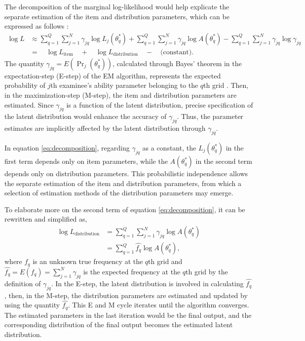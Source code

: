 The decomposition of the marginal log-likelihood would help explicate the
separate estimation of the item and distribution parameters, which can
be expressed as follows \citep{Li:2021}:
\begin{equation}
\begin{split}
\log L &\approx \sum_{q = 1}^{Q}{ \sum_{j = 1}^{N}
{ \gamma_{jq} \log{L_j{\left( \theta^{*}_{q} \right)}} } } +
\sum_{q = 1}^{Q}{ \sum_{j = 1}^{N}
{ \gamma_{jq} \log{A{\left( \theta^{*}_{q} \right)}} } } -
\sum_{q = 1}^{Q}{ \sum_{j = 1}^{N}{ \gamma_{jq} \log{\gamma_{jq}} } } \\
&= \quad \log{L_{\text{item}}} \quad
+ \quad \log{L_{\text{distribution}}} \quad - \quad \text{(constant)} .
\end{split}
\label{eq:decomposition}
\end{equation}
The quantity
\(\gamma_{jq} = E{\left(\Pr_{j}{\left( \theta_{q}^{*} \right)}\right)}\),
calculated through Bayes' theorem in the expectation-step (E-step) of
the EM algorithm, represents the expected probability of \(j\)th
examinee's ability parameter belonging to the \(q\)th grid \citep[see][]{Baker+Kim:2004}. Then, in the maximization-step (M-step), the item and
distribution parameters are estimated. Since \(\gamma_{jq}\) is a function
of the latent distribution, precise specification of the latent
distribution would enhance the accuracy of \(\gamma_{jq}\). Thus, the
parameter estimates are implicitly affected by the latent distribution
through \(\gamma_{jq}\).

In equation \eqref{eq:decomposition}, regarding \(\gamma_{jq}\) as a
constant, the \(L_j{\left( \theta^{*}_{q} \right)}\) in the first
term depends only on item parameters, while the
\(A{\left( \theta^{*}_{q} \right)}\) in the second term depends only on
distribution parameters. This probabilistic independence allows the
separate estimation of the item and distribution parameters, from which
a selection of estimation methods of the distribution parameters may emerge.

To elaborate more on the second term of equation
\eqref{eq:decomposition}, it can be rewritten and simplified as,
\begin{equation}
\begin{split}
\log{L_{\text{distribution}}}
&= \sum_{q = 1}^{Q}{ \sum_{j = 1}^{N}
{ \gamma_{jq} \log{A{\left( \theta^{*}_{q} \right)}} } } \\
&= \sum_{q = 1}^{Q}{ \hat{f_{q}} \log{A{\left( \theta^{*}_{q} \right)}} },
\end{split}
\label{eq:llikelidist}
\end{equation}
where \(f_q\) is an unknown true frequency at the \(q\)th grid and
\(\hat{f_q} = E{\left( f_q \right)} = \sum_{j = 1}^{N}{\gamma_{jq}}\) is
the expected frequency at the \(q\)th grid by the definition of
\(\gamma_{jq}\). In the E-step, the latent distribution is involved in
calculating \(\hat{f_q}\), then, in the M-step, the distribution
parameters are estimated and updated by using the quantity \(\hat{f_q}\).
This E and M cycle iterates until the algorithm converges. The estimated
parameters in the last iteration would be the final output, and the
corresponding distribution of the final output becomes the estimated
latent distribution.


